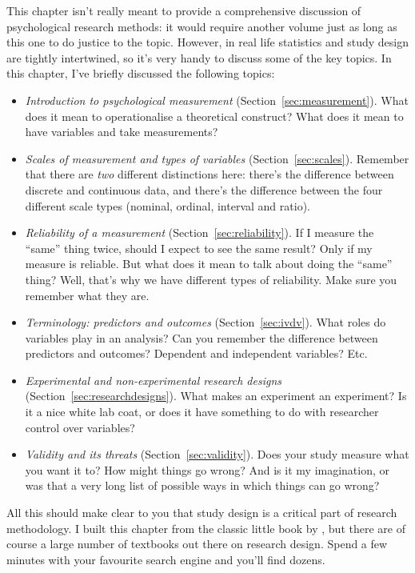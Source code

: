 This chapter isn't really meant to provide a comprehensive discussion of psychological research methods: it would require another volume just as long as this one to do justice to the topic. However, in real life statistics and study design are tightly intertwined, so it's very handy to discuss some of the key topics. In this chapter, I've briefly discussed the following topics:

\begin{itemize}
\item {\it Introduction to psychological measurement} (Section~\ref{sec:measurement}). What does it mean to operationalise a theoretical construct? What does it mean to have variables and take measurements?
\item {\it Scales of measurement and types of variables} (Section~\ref{sec:scales}). Remember that there are {\it two} different distinctions here: there's the difference between discrete and continuous data, and there's the difference between the four different scale types (nominal, ordinal, interval and ratio). 
\item {\it Reliability of a measurement} (Section~\ref{sec:reliability}). If I measure the ``same'' thing twice, should I expect to see the same result? Only if my measure is reliable. But what does it mean to talk about doing the ``same'' thing? Well, that's why we have different types of reliability. Make sure you remember what they are.
\item {\it Terminology: predictors and outcomes} (Section~\ref{sec:ivdv}). What roles do variables play in an analysis? Can you remember the difference between predictors and outcomes? Dependent and independent variables? Etc. 
\item {\it Experimental and non-experimental research designs} (Section~\ref{sec:researchdesigns}). What makes an experiment an experiment? Is it a nice white lab coat, or does it have something to do with researcher control over variables?
\item {\it Validity and its threats} (Section~\ref{sec:validity}). Does your study measure what you want it to? How might things go wrong? And is it my imagination, or was that a very long list of possible ways in which things can go wrong? 
\end{itemize}

\noindent
All this should make clear to you that study design is a critical part of research methodology. I built this chapter from the classic little book by \textcite{Campbell1963}, but there are of course a large number of textbooks out there on research design. Spend a few minutes with your favourite search engine and you'll find dozens. 


